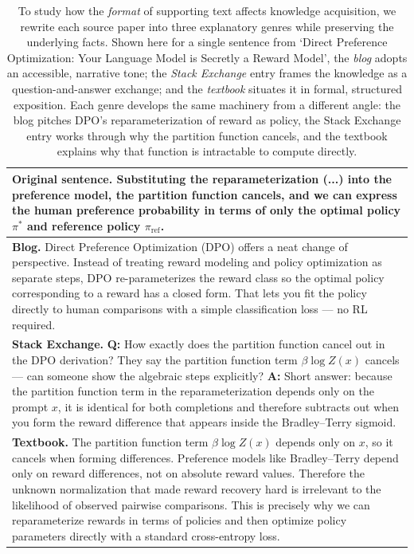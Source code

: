 \begin{table}[t]
\centering
{\footnotesize
\begin{tabularx}{\linewidth}{@{} >{\raggedright\arraybackslash}X @{}}
\toprule
\textbf{Original sentence.} Substituting the reparameterization (...) into the preference model, the partition function cancels, and we can express the human preference probability in terms of only the optimal policy $\pi^*$ and reference policy $\pi_\text{ref}$. \tabularnewline
\midrule
\textbf{Blog.} Direct Preference Optimization (DPO) offers a neat change of perspective. Instead of treating reward modeling and policy optimization as separate steps, DPO re-parameterizes the reward class so the optimal policy corresponding to a reward has a closed form. That lets you fit the policy directly to human comparisons with a simple classification loss --- no RL required. \tabularnewline
\midrule
\textbf{Stack Exchange.} \textbf{Q:} How exactly does the partition function cancel out in the DPO derivation? They say the partition function term $\beta \log Z(x)$ cancels --- can someone show the algebraic steps explicitly? \textbf{A:} Short answer: because the partition function term in the reparameterization depends only on the prompt $x$, it is identical for both completions and therefore subtracts out when you form the reward difference that appears inside the Bradley--Terry sigmoid. \tabularnewline
\midrule
\textbf{Textbook.} The partition function term $\beta\log Z(x)$ depends only on $x$, so it cancels when forming differences. Preference models like Bradley--Terry depend only on reward differences, not on absolute reward values. Therefore the unknown normalization that made reward recovery hard is irrelevant to the likelihood of observed pairwise comparisons. This is precisely why we can reparameterize rewards in terms of policies and then optimize policy parameters directly with a standard cross-entropy loss. \tabularnewline
\bottomrule
\end{tabularx}
}
\caption{\small{To study how the \textit{format} of supporting text affects knowledge acquisition, we rewrite each source paper into three explanatory genres while preserving the underlying facts. Shown here for a single sentence from `Direct Preference Optimization: Your Language Model is Secretly a Reward Model', the \textit{blog} adopts an accessible, narrative tone; the \textit{Stack Exchange} entry frames the knowledge as a question-and-answer exchange; and the \textit{textbook} situates it in formal, structured exposition. Each genre develops the same machinery from a different angle: the blog pitches DPO's reparameterization of reward as policy, the Stack Exchange entry works through why the partition function cancels, and the textbook explains why that function is intractable to compute directly.}}
\label{tab:explanation_formats}
\vspace{-5mm}
\end{table}
